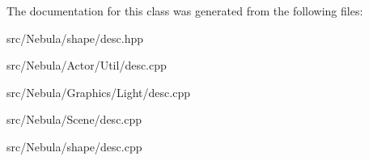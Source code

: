 \-The documentation for this class was generated from the following files\-:\begin{DoxyCompactItemize}
\item 
src/\-Nebula/shape/desc.\-hpp\item 
src/\-Nebula/\-Actor/\-Util/desc.\-cpp\item 
src/\-Nebula/\-Graphics/\-Light/desc.\-cpp\item 
src/\-Nebula/\-Scene/desc.\-cpp\item 
src/\-Nebula/shape/desc.\-cpp\end{DoxyCompactItemize}
